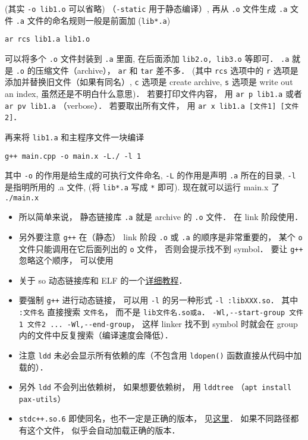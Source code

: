 (其实 \verb`-o lib1.o` 可以省略) （\verb`-static` 用于静态编译）, 再从 \verb|.o| 文件生成 \verb|.a| 文件 \verb|.a| 文件的命名规则一般是前面加 (\verb`lib*.a`)

\begin{lstlisting}[language=none]
ar rcs lib1.a lib1.o
\end{lstlisting}
可以将多个 \verb|.o| 文件封装到 \verb|.a| 里面, 在后面添加 \verb|lib2.o, lib3.o| 等即可． \verb`.a` 就是 \verb`.o` 的压缩文件（archive）， \verb`ar` 和 \verb`tar` 差不多． (其中 \verb|rcs| 选项中的 \verb`r` 选项是添加并替换旧文件（如果有同名）, \verb`c` 选项是 create archive, \verb`s` 选项是 write out an index, 虽然还是不明白什么意思)． 若要打印文件内容， 用 \verb|ar p lib1.a| 或者 \verb|ar pv lib1.a| （verbose）． 若要取出所有文件， 用 \verb|ar x lib1.a [文件1] [文件2]|．

再来将 \verb|lib1.a| 和主程序文件一块编译
\begin{lstlisting}[language=none]
g++ main.cpp -o main.x -L./ -l 1
\end{lstlisting}

其中 \verb`-o` 的作用是给生成的可执行文件命名, \verb`-L` 的作用是声明 \verb`.a` 所在的目录, \verb`-l` 是指明所用的 .a 文件, (将 \verb`lib*.a` 写成 \verb`*` 即可).
现在就可以运行 main.x 了
\verb`./main.x`

\begin{itemize}
\item 所以简单来说， 静态链接库 \verb`.a` 就是 archive 的 \verb`.o` 文件． 在 link 阶段使用．
\item 另外要注意 \verb`g++` 在（静态） link 阶段 \verb`.o` 或 \verb`.a` 的顺序是非常重要的， 某个 \verb`o` 文件只能调用在它后面列出的 \verb`o` 文件， 否则会提示找不到 symbol． 要让 \verb`g++` 忽略这个顺序， 可以使用
\item 关于 so 动态链接库和 ELF 的一个\href{https://amir.rachum.com/blog/2016/09/17/shared-libraries/}{详细教程}．
\item 要强制 \verb|g++| 进行动态链接， 可以用 \verb|-l| 的另一种形式 \verb|-l :libXXX.so|． 其中 \verb|:文件名| 直接搜索 \verb|文件名|， 而不是 \verb|lib文件名.so或a|．
\verb`-Wl,--start-group 文件1 文件2 ... -Wl,--end-group`， 这样 linker 找不到 symbol 时就会在 group 内的文件中反复搜索（编译速度会降低）．
\item 注意 \verb|ldd| 未必会显示所有依赖的库（不包含用 \verb|ldopen()| 函数直接从代码中加载的）．
\item 另外 \verb|ldd| 不会列出依赖树， 如果想要依赖树， 用 \verb|lddtree| （\verb|apt install pax-utils|）
\item \verb|stdc++.so.6| 即使同名，也不一定是正确的版本， 见\href{https://unix.stackexchange.com/questions/458659/what-do-the-multiple-glibc-versions-mean-in-the-output-of-ldd}{这里}． 如果不同路径都有这个文件， 似乎会自动加载正确的版本．
\end{itemize}

